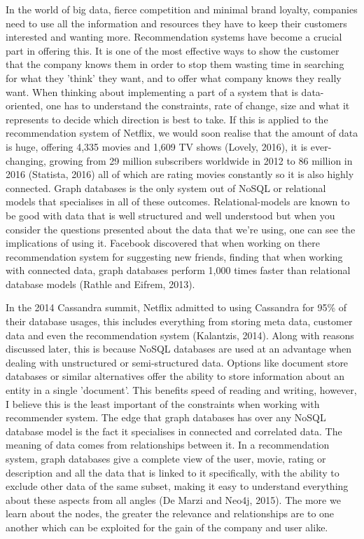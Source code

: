 \documentclass[a4paper]{article}
\begin{document}
\justify

In the world of big data, fierce competition and minimal brand loyalty, companies need to use all the information and resources they have to keep their customers interested and wanting more. Recommendation systems have become a crucial part in offering this. It is one of the most effective ways to show the customer that the company knows them in order to stop them wasting time in searching for what they 'think' they want, and to offer what company knows they really want. When thinking about implementing a part of a system that is data-oriented, one has to understand the constraints, rate of change, size and what it represents to decide which direction is best to take. If this is applied to the recommendation system of Netflix, we would soon realise that the amount of data is huge, offering 4,335 movies and 1,609 TV shows (Lovely, 2016), it is ever-changing, growing from 29 million subscribers worldwide in 2012 to 86 million in 2016 (Statista, 2016) all of which are rating movies constantly so it is also highly connected. Graph databases is the only system out of NoSQL or relational models that specialises in all of these outcomes. Relational-models are known to be good with data that is well structured and well understood but when you consider the questions presented about the data that we're using, one can see the implications of using it. Facebook discovered that when working on there recommendation system for suggesting new friends, finding that when working with connected data, graph databases perform 1,000 times faster than relational database models (Rathle and Eifrem, 2013).

In the 2014 Cassandra summit, Netflix admitted to using Cassandra for 95\% of their database usages, this includes everything from storing meta data, customer data and even the recommendation system (Kalantzis, 2014). Along with reasons discussed later, this is because NoSQL databases are used at an advantage when dealing with unstructured or semi-structured data. Options like document store databases or similar alternatives offer the ability to store information about an entity in a single 'document'. This benefits speed of reading and writing, however, I believe this is the least important of the constraints when working with recommender system. The edge that graph databases has over any NoSQL database model is the fact it specialises in connected and correlated data. The meaning of data comes from relationships between it. In a recommendation system, graph databases give a complete view of the user, movie, rating or description and all the data that is linked to it specifically, with the ability to exclude other data of the same subset, making it easy to understand everything about these aspects from all angles (De Marzi and Neo4j, 2015). The more we learn about the nodes, the greater the relevance and relationships are to one another which can be exploited for the gain of the company and user alike. \par
\end{document}
